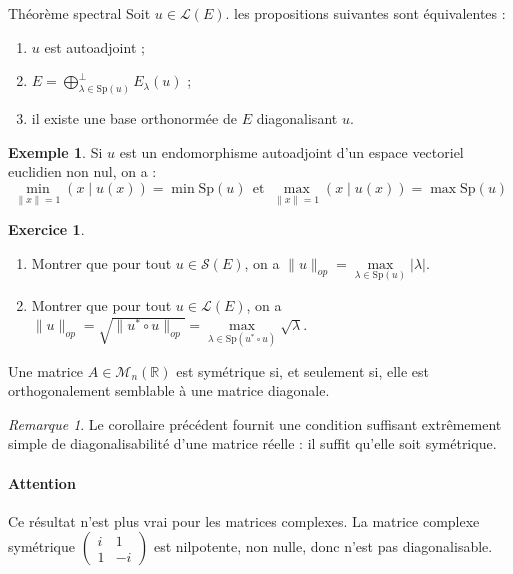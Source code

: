 \documentclass[french]{article}
\newcommand{\R}{\mathbb{R}}
\newcommand{\st}{^*}
\theoremstyle{plain}
\theoremstyle{definition}
\newtheorem*{ex}{Exemple}
\newtheorem{exo}{Exercice}
\theoremstyle{remark}
\newtheorem*{rmq}{Remarque}
\begin{document}
\begin{thm}{Théorème spectral}
	Soit $u\in\mathcal{L}(E)$. les propositions suivantes sont équivalentes :
	\begin{enumerate}
		\item $u$ est autoadjoint ;
		\item $\displaystyle E=\bigoplus_{\lambda\in\text{Sp}(u)}^{\bot}E_\lambda(u)$ ;
		\item il existe une base orthonormée de $E$ diagonalisant $u$.
	\end{enumerate}
\end{thm}

\begin{ex}
	Si $u$ est un endomorphisme autoadjoint d'un espace vectoriel euclidien non nul, on a : $$\underset{\lVert x\rVert=1}{\min}(x\mid u(x))=\min\text{Sp}(u)\ \ \text{et}\ \ \underset{\lVert x\rVert=1}{\max}(x\mid u(x))=\max\text{Sp}(u)$$
\end{ex}

\begin{exo}
	\begin{enumerate}
		\item Montrer que pour tout $u\in\mathcal{S}(E)$, on a $\lVert u\rVert_{op}=\displaystyle\underset{\lambda\in\text{Sp}(u)}{\max}\lvert\lambda\rvert$.
		\item Montrer que pour tout $u\in\mathcal{L}(E)$, on a $\lVert u\rVert_{op}=\sqrt{\lVert u\st\circ u\rVert_{op}}=\displaystyle\underset{\lambda\in\text{Sp}(u\st\circ u)}{\max}\sqrt{\lambda}$.
	\end{enumerate}
\end{exo}

\begin{thm}{}
	Une matrice $A\in\mathcal{M}_n(\R)$ est symétrique si, et seulement si, elle est orthogonalement semblable à une matrice diagonale.
\end{thm}

\begin{rmq}
	Le corollaire précédent fournit une condition suffisant extrêmement simple de diagonalisabilité d'une matrice réelle : il suffit qu'elle soit symétrique.
\end{rmq}

\paragraph{Attention} Ce résultat n'est plus vrai pour les matrices complexes. La matrice complexe symétrique $\displaystyle\begin{pmatrix}
	i&1\\
	1&-i
\end{pmatrix}$ est nilpotente, non nulle, donc n'est pas diagonalisable.
\end{document}
